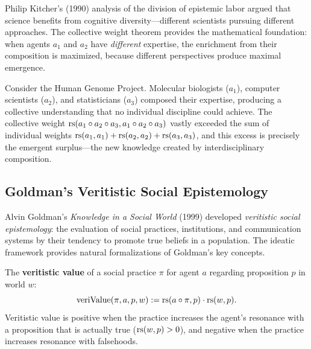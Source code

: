 \begin{remark}
Philip Kitcher's (1990) analysis of the division of epistemic labor argued that
science benefits from cognitive diversity---different scientists pursuing different
approaches. The collective weight theorem provides the mathematical foundation:
when agents $a_1$ and $a_2$ have \emph{different} expertise, the enrichment from
their composition is maximized, because different perspectives produce maximal
emergence.

Consider the Human Genome Project. Molecular biologists ($a_1$), computer
scientists ($a_2$), and statisticians ($a_3$) composed their expertise, producing
a collective understanding that no individual discipline could achieve. The
collective weight $\mathrm{rs}(a_1 \circ a_2 \circ a_3, a_1 \circ a_2
\circ a_3)$ vastly exceeded the sum of individual weights $\mathrm{rs}(a_1, a_1) +
\mathrm{rs}(a_2, a_2) + \mathrm{rs}(a_3, a_3)$, and this excess is precisely the emergent
surplus---the new knowledge created by interdisciplinary composition.
\end{remark}

\subsection{Goldman's Veritistic Social Epistemology}

Alvin Goldman's \emph{Knowledge in a Social World} (1999) developed
\emph{veritistic social epistemology}: the evaluation of social practices,
institutions, and communication systems by their tendency to promote true beliefs
in a population. The ideatic framework provides natural formalizations of
Goldman's key concepts.

\begin{definition}
\label{def:veritistic-value}
The \textbf{veritistic value} of a social practice $\pi$ for agent $a$ regarding
proposition $p$ in world $w$:
\[
  \mathrm{veriValue}(\pi, a, p, w) := \mathrm{rs}(a \circ \pi, p) \cdot \mathrm{rs}(w, p).
\]
Veritistic value is positive when the practice increases the agent's resonance
with a proposition that is actually true ($\mathrm{rs}(w, p) > 0$), and negative when
the practice increases resonance with falsehoods.
\end{definition}

